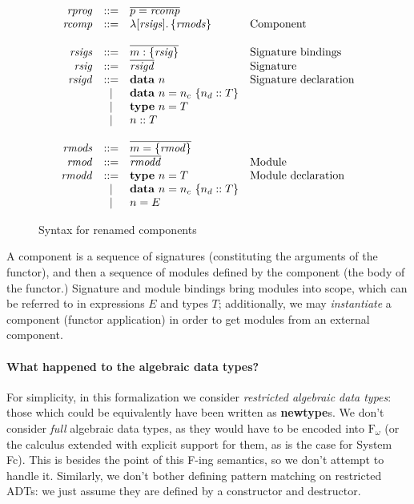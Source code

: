 \documentclass{article}
\begin{document}
\begin{figure}[H]
\[
\begin{array}{rcll}
\mathit{rprog} &::=& \overline{p = \mathit{rcomp}} \\
\mathit{rcomp} &::=& \lambda [ \mathit{rsigs} ].\, \{ \mathit{rmods} \} & \mbox{Component} \\
\\
\mathit{rsigs} &::=& \overline{m : \{ \mathit{rsig} \}} & \mbox{Signature bindings} \\
\mathit{rsig}  &::=& \overline{\mathit{rsigd}} & \mbox{Signature} \\
\mathit{rsigd}  &::=& \mathbf{data}~n & \mbox{Signature declaration} \\
           & | & \mathbf{data}~n = n_c~\{ n_d :: T \} \\
           & | & \mathbf{type}~n = T \\
           & | & n :: T \\
\\
\mathit{rmods} &::=& \overline{m = \{ \mathit{rmod} \}} & \\
\mathit{rmod} &::=& \overline{\mathit{rmodd}} & \mbox{Module} \\
\mathit{rmodd} &::=& \mathbf{type}~n = T & \mbox{Module declaration} \\
          & | & \mathbf{data}~n = n_c~\{ n_d :: T \} \\
          & | & n = E \\
\end{array}
\]
\caption{Syntax for renamed components}
\end{figure}

\noindent
A component is a sequence of signatures (constituting the arguments
of the functor), and then a sequence of modules defined by the component
(the body of the functor.)  Signature and module bindings bring modules
into scope, which can be referred to in expressions $E$ and types $T$;
additionally, we may \emph{instantiate} a component (functor application)
in order to get modules from an external component.

\paragraph{What happened to the algebraic data types?}
For simplicity, in this formalization we consider \emph{restricted
algebraic data types}: those which could be equivalently have been
written as \textbf{newtype}s.  We don't consider \emph{full} algebraic
data types, as they would have to be encoded into $\mathrm{F}_\omega$
(or the calculus extended with explicit support for them, as is the case
for System Fc).  This is besides the point of this F-ing semantics, so
we don't attempt to handle it.  Similarly, we don't bother
defining pattern matching on restricted ADTs: we just assume they
are defined by a constructor and destructor.
\end{document}
